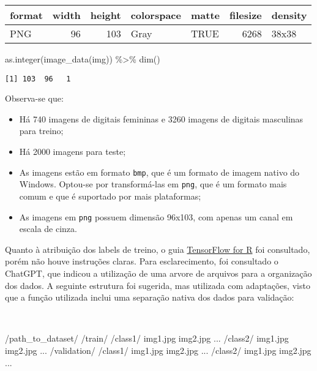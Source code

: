 \documentclass[
  a4paperpaper,
]{article}
\newenvironment{Shaded}{\begin{snugshade}}{\end{snugshade}}
\newcommand{\ExtensionTok}[1]{\textcolor[rgb]{0.00,0.23,0.31}{#1}}
\newcommand{\FunctionTok}[1]{\textcolor[rgb]{0.28,0.35,0.67}{#1}}
\newcommand{\NormalTok}[1]{\textcolor[rgb]{0.00,0.23,0.31}{#1}}
\newcommand{\SpecialCharTok}[1]{\textcolor[rgb]{0.37,0.37,0.37}{#1}}
\providecommand{\tightlist}{%
  \setlength{\itemsep}{0pt}\setlength{\parskip}{0pt}}\usepackage{longtable,booktabs,array}
\begin{document}
\begin{longtable}[]{@{}lrrllrl@{}}
\toprule\noalign{}
format & width & height & colorspace & matte & filesize & density \\
\midrule\noalign{}
\endhead
\bottomrule\noalign{}
\endlastfoot
PNG & 96 & 103 & Gray & TRUE & 6268 & 38x38 \\
\end{longtable}

\begin{Shaded}
\begin{Highlighting}[]
\FunctionTok{as.integer}\NormalTok{(}\FunctionTok{image\_data}\NormalTok{(img)) }\SpecialCharTok{\%\textgreater{}\%} \FunctionTok{dim}\NormalTok{()}
\end{Highlighting}
\end{Shaded}

\begin{verbatim}
[1] 103  96   1
\end{verbatim}

Observa-se que:

\begin{itemize}
\tightlist
\item
  Há 740 imagens de digitais femininas e 3260 imagens de digitais
  masculinas para treino;
\item
  Há 2000 imagens para teste;
\item
  As imagens estão em formato \texttt{bmp}, que é um formato de imagem
  nativo do Windows. Optou-se por transformá-las em \texttt{png}, que é
  um formato mais comum e que é suportado por mais plataformas;
\item
  As imagens em \texttt{png} possuem dimensão 96x103, com apenas um
  canal em escala de cinza.
\end{itemize}

Quanto à atribuição dos labels de treino, o guia
\href{https://tensorflow.rstudio.com/tutorials/keras/classification}{TensorFlow
for R} foi consultado, porém não houve instruções claras. Para
esclarecimento, foi consultado o ChatGPT, que indicou a utilização de
uma arvore de arquivos para a organização dos dados. A seguinte
estrutura foi sugerida, mas utilizada com adaptações, visto que a função
utilizada inclui uma separação nativa dos dados para validação:

~

\begin{Shaded}
\begin{Highlighting}[]
\ExtensionTok{/path\_to\_dataset/}
    \ExtensionTok{/train/}
        \ExtensionTok{/class1/}
            \ExtensionTok{img1.jpg}
            \ExtensionTok{img2.jpg}
            \ExtensionTok{...}
        \ExtensionTok{/class2/}
            \ExtensionTok{img1.jpg}
            \ExtensionTok{img2.jpg}
            \ExtensionTok{...}
    \ExtensionTok{/validation/}
        \ExtensionTok{/class1/}
            \ExtensionTok{img1.jpg}
            \ExtensionTok{img2.jpg}
            \ExtensionTok{...}
        \ExtensionTok{/class2/}
            \ExtensionTok{img1.jpg}
            \ExtensionTok{img2.jpg}
            \ExtensionTok{...}
\end{Highlighting}
\end{Shaded}
\end{document}
